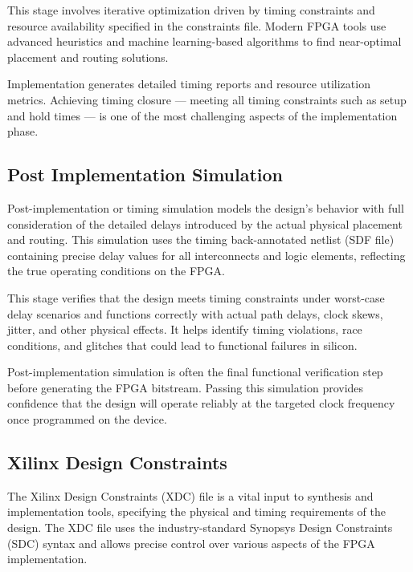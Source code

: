 This stage involves iterative optimization driven by timing constraints and resource availability specified in the constraints file. Modern FPGA tools use advanced heuristics and machine learning-based algorithms to find near-optimal placement and routing solutions.

Implementation generates detailed timing reports and resource utilization metrics. Achieving timing closure — meeting all timing constraints such as setup and hold times — is one of the most challenging aspects of the implementation phase.

\subsection{Post Implementation Simulation}
Post-implementation or timing simulation models the design’s behavior with full consideration of the detailed delays introduced by the actual physical placement and routing. This simulation uses the timing back-annotated netlist (SDF file) containing precise delay values for all interconnects and logic elements, reflecting the true operating conditions on the FPGA.

This stage verifies that the design meets timing constraints under worst-case delay scenarios and functions correctly with actual path delays, clock skews, jitter, and other physical effects. It helps identify timing violations, race conditions, and glitches that could lead to functional failures in silicon.

Post-implementation simulation is often the final functional verification step before generating the FPGA bitstream. Passing this simulation provides confidence that the design will operate reliably at the targeted clock frequency once programmed on the device.

\subsection{Xilinx Design Constraints}
The Xilinx Design Constraints (XDC) file is a vital input to synthesis and implementation tools, specifying the physical and timing requirements of the design. The XDC file uses the industry-standard Synopsys Design Constraints (SDC) syntax and allows precise control over various aspects of the FPGA implementation\cite{fpga-flow-1}.

